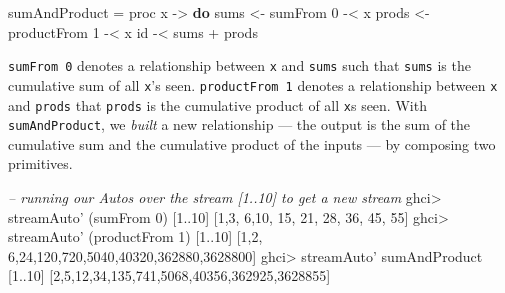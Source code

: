 \documentclass[]{article}
\newenvironment{Shaded}{}{}
\newcommand{\CommentTok}[1]{\textcolor[rgb]{0.38,0.63,0.69}{\textit{#1}}}
\newcommand{\DecValTok}[1]{\textcolor[rgb]{0.25,0.63,0.44}{#1}}
\newcommand{\FunctionTok}[1]{\textcolor[rgb]{0.02,0.16,0.49}{#1}}
\newcommand{\KeywordTok}[1]{\textcolor[rgb]{0.00,0.44,0.13}{\textbf{#1}}}
\newcommand{\NormalTok}[1]{#1}
\newcommand{\OtherTok}[1]{\textcolor[rgb]{0.00,0.44,0.13}{#1}}
\begin{document}
\begin{Shaded}
\begin{Highlighting}[]
\NormalTok{sumAndProduct }\FunctionTok{=}\NormalTok{ proc x }\OtherTok{->} \KeywordTok{do}
\NormalTok{    sums  }\OtherTok{<-}\NormalTok{ sumFrom }\DecValTok{0}     \FunctionTok{-<}\NormalTok{ x}
\NormalTok{    prods }\OtherTok{<-}\NormalTok{ productFrom }\DecValTok{1} \FunctionTok{-<}\NormalTok{ x}
\NormalTok{    id }\FunctionTok{-<}\NormalTok{ sums }\FunctionTok{+}\NormalTok{ prods}
\end{Highlighting}
\end{Shaded}

\texttt{sumFrom\ 0} denotes a relationship between \texttt{x} and \texttt{sums}
such that \texttt{sums} is the cumulative sum of all \texttt{x}'s seen.
\texttt{productFrom\ 1} denotes a relationship between \texttt{x} and
\texttt{prods} that \texttt{prods} is the cumulative product of all \texttt{x}s
seen. With \texttt{sumAndProduct}, we \emph{built} a new relationship --- the
output is the sum of the cumulative sum and the cumulative product of the inputs
--- by composing two primitives.

\begin{Shaded}
\begin{Highlighting}[]
\CommentTok{-- running our Autos over the stream [1..10] to get a new stream}
\NormalTok{ghci}\FunctionTok{>}\NormalTok{ streamAuto' (sumFrom }\DecValTok{0}\NormalTok{) [}\DecValTok{1}\FunctionTok{..}\DecValTok{10}\NormalTok{]}
\NormalTok{[}\DecValTok{1}\NormalTok{,}\DecValTok{3}\NormalTok{, }\DecValTok{6}\NormalTok{,}\DecValTok{10}\NormalTok{, }\DecValTok{15}\NormalTok{, }\DecValTok{21}\NormalTok{,  }\DecValTok{28}\NormalTok{,   }\DecValTok{36}\NormalTok{,    }\DecValTok{45}\NormalTok{,     }\DecValTok{55}\NormalTok{]}
\NormalTok{ghci}\FunctionTok{>}\NormalTok{ streamAuto' (productFrom }\DecValTok{1}\NormalTok{) [}\DecValTok{1}\FunctionTok{..}\DecValTok{10}\NormalTok{]}
\NormalTok{[}\DecValTok{1}\NormalTok{,}\DecValTok{2}\NormalTok{, }\DecValTok{6}\NormalTok{,}\DecValTok{24}\NormalTok{,}\DecValTok{120}\NormalTok{,}\DecValTok{720}\NormalTok{,}\DecValTok{5040}\NormalTok{,}\DecValTok{40320}\NormalTok{,}\DecValTok{362880}\NormalTok{,}\DecValTok{3628800}\NormalTok{]}
\NormalTok{ghci}\FunctionTok{>}\NormalTok{ streamAuto' sumAndProduct [}\DecValTok{1}\FunctionTok{..}\DecValTok{10}\NormalTok{]}
\NormalTok{[}\DecValTok{2}\NormalTok{,}\DecValTok{5}\NormalTok{,}\DecValTok{12}\NormalTok{,}\DecValTok{34}\NormalTok{,}\DecValTok{135}\NormalTok{,}\DecValTok{741}\NormalTok{,}\DecValTok{5068}\NormalTok{,}\DecValTok{40356}\NormalTok{,}\DecValTok{362925}\NormalTok{,}\DecValTok{3628855}\NormalTok{]}
\end{Highlighting}
\end{Shaded}
\end{document}
